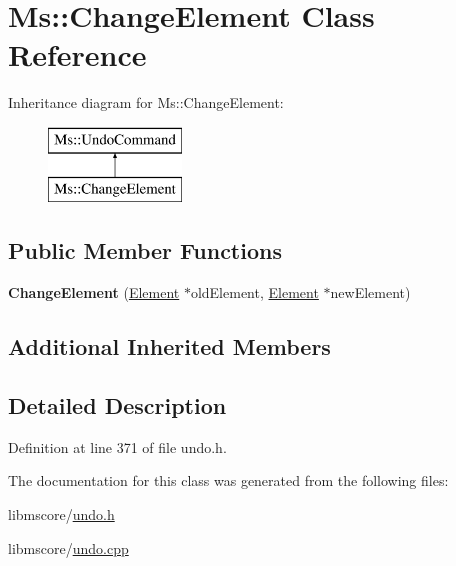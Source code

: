 \hypertarget{class_ms_1_1_change_element}{}\section{Ms\+:\+:Change\+Element Class Reference}
\label{class_ms_1_1_change_element}
Inheritance diagram for Ms\+:\+:Change\+Element\+:\begin{figure}[H]
\begin{center}
\leavevmode
\includegraphics[height=2.000000cm]{class_ms_1_1_change_element}
\end{center}
\end{figure}
\subsection*{Public Member Functions}
\begin{DoxyCompactItemize}
\item 
\mbox{\label{class_ms_1_1_change_element_a118149ec5b126f31ca1ddc506ea8d239}} 
{\bfseries Change\+Element} (\hyperlink{class_ms_1_1_element}{Element} $\ast$old\+Element, \hyperlink{class_ms_1_1_element}{Element} $\ast$new\+Element)
\end{DoxyCompactItemize}
\subsection*{Additional Inherited Members}


\subsection{Detailed Description}


Definition at line 371 of file undo.\+h.



The documentation for this class was generated from the following files\+:\begin{DoxyCompactItemize}
\item 
libmscore/\hyperlink{undo_8h}{undo.\+h}\item 
libmscore/\hyperlink{undo_8cpp}{undo.\+cpp}\end{DoxyCompactItemize}
